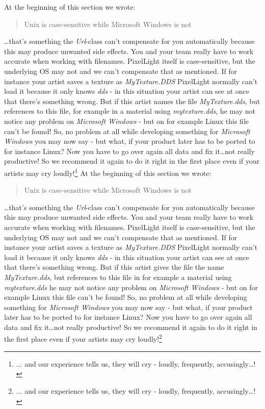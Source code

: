 At the beginning of this section we wrote: \begin{quote}Unix is case-sensitive while Microsoft Windows is not\end{quote}\ldots that's something the \emph{Url}-class can't compensate for you automatically because this may produce unwanted side effects. You and your team really have to work accurate when working with filenames. PixelLight itself is case-sensitive, but the underlying \ac{OS} may not and we can't compensate that as mentioned. If for instance your artist saves a texture as \emph{MyTexture.DDS} PixelLight normally can't load it because it only knows \emph{dds} - in this situation your artist can see at once that there's something wrong. But if this artist names the file \emph{MyTexture.dds}, but references to this file, for example in a material using \emph{mytexture.dds}, he may not notice any problem on \emph{Microsoft Windows} - but on for example Linux this file can't be found! So, no problem at all while developing something for \emph{Microsoft Windows} you may now say - but what, if your product later has to be ported to for instance Linux? Now you have to go over again all data and fix it\ldots not really productive! So we recommend it again to do it right in the first place even if your artists may cry loudly!\footnote{... and our experience tells us, they will cry - loudly, frequently, accusingly\ldots !}
At the beginning of this section we wrote: \begin{quote}Unix is case-sensitive while Microsoft Windows is not\end{quote}\ldots that's something the \emph{Url}-class can't compensate for you automatically because this may produce unwanted side effects. You and your team really have to work accurate when working with filenames. PixelLight itself is case-sensitive, but the underlying \ac{OS} may not and we can't compensate that as mentioned. If for instance your artist saves a texture as \emph{MyTexture.DDS} PixelLight normally can't load it because it only knows \emph{dds} - in this situation your artist can see at once that there's something wrong. But if this artist gives the file the name \emph{MyTexture.dds}, but references to this file in for example a material using \emph{mytexture.dds} he may not notice any problem on \emph{Microsoft Windows} - but on for example Linux this file can't be found! So, no problem at all while developing something for \emph{Microsoft Windows} you may now say - but what, if your product later has to be ported to for instance Linux? Now you have to go over again all data and fix it\ldots not really productive! So we recommend it again to do it right in the first place even if your artists may cry loudly!\footnote{... and our experience tells us, they will cry - loudly, frequently, accusingly\ldots !}
